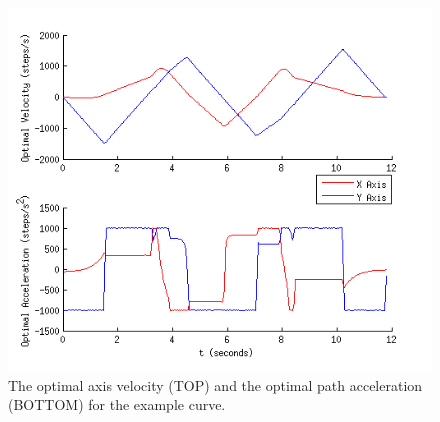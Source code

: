 \begin{figure}  
\includegraphics[width=\textwidth]{figures/optimisation/bangbang_xy_ddt_dt.png}
\caption[$\dot{\textbf{q}}^*(t)$ and $\ddot{\textbf{q}}^*(t)$]{
The optimal axis velocity (TOP) and the optimal path acceleration (BOTTOM) for the example curve.
\label{fig:bangbang}}
\end{figure}



